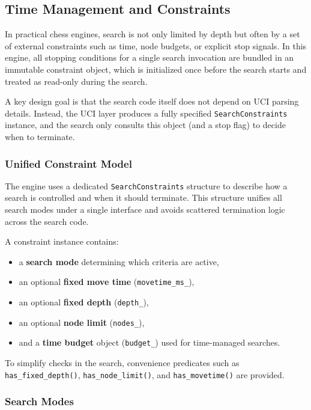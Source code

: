 \subsection{Time Management and Constraints}
\label{sec:time_management}

In practical chess engines, search is not only limited by depth but often by a
set of external constraints such as time, node budgets, or explicit stop
signals. In this engine, all stopping conditions for a single search invocation
are bundled in an immutable constraint object, which is initialized once before
the search starts and treated as read-only during the search.

A key design goal is that the search code itself does not depend on UCI parsing
details. Instead, the UCI layer produces a fully specified \texttt{SearchConstraints}
instance, and the search only consults this object (and a stop flag) to decide
when to terminate.

\subsubsection{Unified Constraint Model}

The engine uses a dedicated \texttt{SearchConstraints} structure to describe how
a search is controlled and when it should terminate. This structure unifies all
search modes under a single interface and avoids scattered termination logic
across the search code.

A constraint instance contains:
\begin{itemize}
    \item a \textbf{search mode} determining which criteria are active,
    \item an optional \textbf{fixed move time} (\texttt{movetime\_ms\_}),
    \item an optional \textbf{fixed depth} (\texttt{depth\_}),
    \item an optional \textbf{node limit} (\texttt{nodes\_}),
    \item and a \textbf{time budget} object (\texttt{budget\_}) used for time-managed searches.
\end{itemize}

To simplify checks in the search, convenience predicates such as
\texttt{has\_fixed\_depth()}, \texttt{has\_node\_limit()}, and \texttt{has\_movetime()}
are provided.

\subsubsection{Search Modes}

